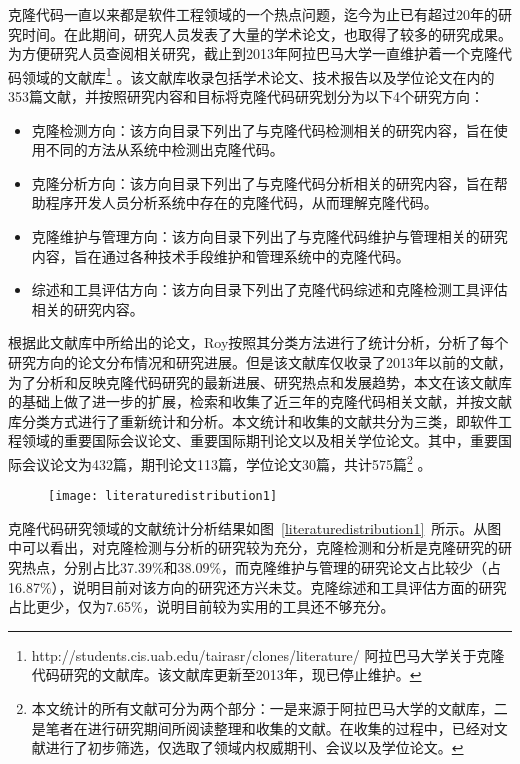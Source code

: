 克隆代码一直以来都是软件工程领域的一个热点问题，迄今为止已有超过20年的研究时间。在此期间，研究人员发表了大量的学术论文，也取得了较多的研究成果。为方便研究人员查阅相关研究，截止到2013年阿拉巴马大学一直维护着一个克隆代码领域的文献库\footnote{ http://students.cis.uab.edu/tairasr/clones/literature/ 阿拉巴马大学关于克隆代码研究的文献库。该文献库更新至2013年，现已停止维护。} 。该文献库收录包括学术论文、技术报告以及学位论文在内的353篇文献，并按照研究内容和目标将克隆代码研究划分为以下4个研究方向：
\begin{itemize}
\item {克隆检测方向：该方向目录下列出了与克隆代码检测相关的研究内容，旨在使用不同的方法从系统中检测出克隆代码。}
\item 克隆分析方向：该方向目录下列出了与克隆代码分析相关的研究内容，旨在帮助程序开发人员分析系统中存在的克隆代码，从而理解克隆代码。
\item 克隆维护与管理方向：该方向目录下列出了与克隆代码维护与管理相关的研究内容，旨在通过各种技术手段维护和管理系统中的克隆代码。
\item 综述和工具评估方向：该方向目录下列出了克隆代码综述和克隆检测工具评估相关的研究内容。
\end{itemize}

根据此文献库中所给出的论文，Roy按照其分类方法进行了统计分析，分析了每个研究方向的论文分布情况和研究进展\cite{roy2014vision}。但是该文献库仅收录了2013年以前的文献，为了分析和反映克隆代码研究的最新进展、研究热点和发展趋势，本文在该文献库的基础上做了进一步的扩展，检索和收集了近三年的克隆代码相关文献，并按文献库分类方式进行了重新统计和分析。本文统计和收集的文献共分为三类，即软件工程领域的重要国际会议论文、重要国际期刊论文以及相关学位论文。其中，重要国际会议论文为432篇，期刊论文113篇，学位论文30篇，共计575篇\footnote{本文统计的所有文献可分为两个部分：一是来源于阿拉巴马大学的文献库，二是笔者在进行研究期间所阅读整理和收集的文献。在收集的过程中，已经对文献进行了初步筛选，仅选取了领域内权威期刊、会议以及学位论文。} 。

\begin{figure}[htbp]
\centering
\texttt{[image: literaturedistribution1]}
\vspace{-1em}
\end{figure}

克隆代码研究领域的文献统计分析结果如图~\ref{literaturedistribution1}~所示。从图中可以看出，对克隆检测与分析的研究较为充分，克隆检测和分析是克隆研究的研究热点，分别占比37.39\%和38.09\%，而克隆维护与管理的研究论文占比较少（占16.87\%），说明目前对该方向的研究还方兴未艾。克隆综述和工具评估方面的研究占比更少，仅为7.65\%，说明目前较为实用的工具还不够充分。

